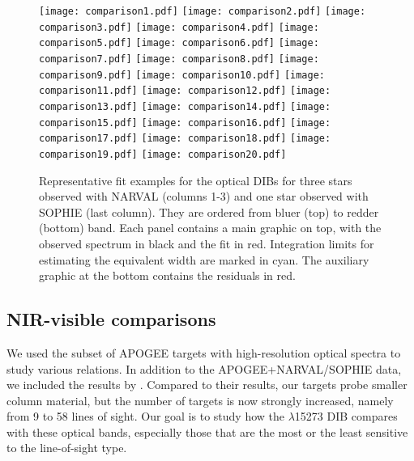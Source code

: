 \documentclass[printer]{aa} %
\begin{document}
\begin{figure*}
\centering
\texttt{[image: comparison1.pdf]}
\texttt{[image: comparison2.pdf]}
\texttt{[image: comparison3.pdf]}
\texttt{[image: comparison4.pdf]}   
\texttt{[image: comparison5.pdf]}
\texttt{[image: comparison6.pdf]}
\texttt{[image: comparison7.pdf]}
\texttt{[image: comparison8.pdf]}
\texttt{[image: comparison9.pdf]}
\texttt{[image: comparison10.pdf]} 
\texttt{[image: comparison11.pdf]} 
\texttt{[image: comparison12.pdf]}
\texttt{[image: comparison13.pdf]}
 \texttt{[image: comparison14.pdf]}
 \texttt{[image: comparison15.pdf]}
 \texttt{[image: comparison16.pdf]}
 \texttt{[image: comparison17.pdf]}
\texttt{[image: comparison18.pdf]}
\texttt{[image: comparison19.pdf]}
\texttt{[image: comparison20.pdf]}
  
\caption{\label{COMPARISON_DIB} Representative fit examples for the optical DIBs for three stars observed with NARVAL (columns 1-3) and one star observed with SOPHIE (last column). They are ordered from bluer (top) to redder (bottom) band. Each panel contains a main graphic on top, with the observed spectrum in black and the fit in red. Integration limits for estimating the equivalent width are marked in cyan. The auxiliary graphic at the bottom contains the residuals in red.}
\end{figure*}

\subsection{NIR-visible comparisons}

We used the subset of APOGEE targets with high-resolution optical spectra to study various relations. In addition to the APOGEE+NARVAL/SOPHIE data, we included the results by \cite{Cox14}. Compared to their results, our targets probe smaller column material, but the number of targets is now strongly increased, namely from 9 to 58 lines of sight. Our goal is to study how the $\lambda$15273 DIB compares with these optical bands, especially those  that are the most or the least sensitive to the line-of-sight type. 
\end{document}
